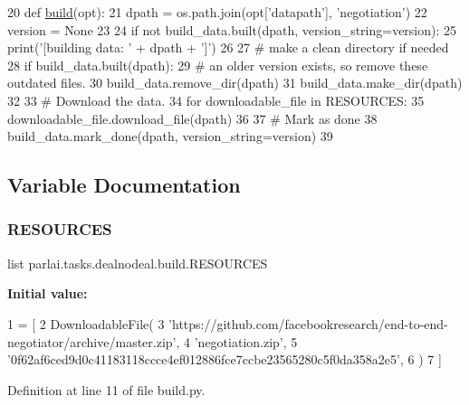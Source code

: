\begin{DoxyCode}
20 \textcolor{keyword}{def }\hyperlink{namespacedialog__babi__feedback_1_1build_a7a9d289f7493a5ded13c4b7f071b6184}{build}(opt):
21     dpath = os.path.join(opt[\textcolor{stringliteral}{'datapath'}], \textcolor{stringliteral}{'negotiation'})
22     version = \textcolor{keywordtype}{None}
23 
24     \textcolor{keywordflow}{if} \textcolor{keywordflow}{not} build\_data.built(dpath, version\_string=version):
25         print(\textcolor{stringliteral}{'[building data: '} + dpath + \textcolor{stringliteral}{']'})
26 
27         \textcolor{comment}{# make a clean directory if needed}
28         \textcolor{keywordflow}{if} build\_data.built(dpath):
29             \textcolor{comment}{# an older version exists, so remove these outdated files.}
30             build\_data.remove\_dir(dpath)
31         build\_data.make\_dir(dpath)
32 
33         \textcolor{comment}{# Download the data.}
34         \textcolor{keywordflow}{for} downloadable\_file \textcolor{keywordflow}{in} RESOURCES:
35             downloadable\_file.download\_file(dpath)
36 
37         \textcolor{comment}{# Mark as done}
38         build\_data.mark\_done(dpath, version\_string=version)
39 \end{DoxyCode}


\subsection{Variable Documentation}
\mbox{\label{namespaceparlai_1_1tasks_1_1dealnodeal_1_1build_a241dcbf765e96f5beed61989453698a9}} 
\subsubsection{\texorpdfstring{R\+E\+S\+O\+U\+R\+C\+ES}{RESOURCES}}
{\footnotesize\ttfamily list parlai.\+tasks.\+dealnodeal.\+build.\+R\+E\+S\+O\+U\+R\+C\+ES}

{\bfseries Initial value\+:}
\begin{DoxyCode}
1 =  [
2     DownloadableFile(
3         \textcolor{stringliteral}{'https://github.com/facebookresearch/end-to-end-negotiator/archive/master.zip'},
4         \textcolor{stringliteral}{'negotiation.zip'},
5         \textcolor{stringliteral}{'0f62af6ced9d0c41183118ccce4ef012886fce7ccbe23565280c5f0da358a2e5'},
6     )
7 ]
\end{DoxyCode}


Definition at line 11 of file build.\+py.

